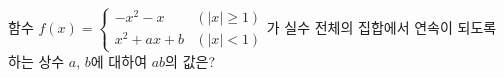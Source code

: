 함수 $f(x)=\begin{cases} -x^2-x & (|x|\ge 1) \\ x^2+ax+b & (|x|<1) \end{cases}$가 실수 전체의 집합에서 연속이 되도록 하는 상수 $a$, $b$에 대하여 $ab$의 값은?
